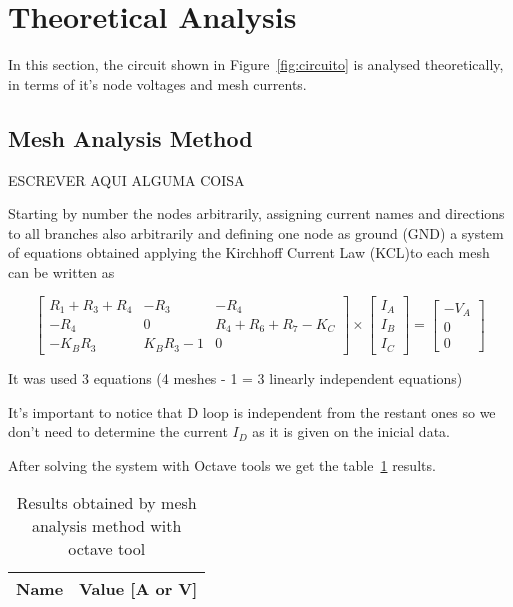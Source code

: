 \section{Theoretical Analysis}
\label{sec:analysis}

\hspace{0,5cm} In this section, the circuit shown in Figure~\ref{fig:circuito} is analysed
theoretically, in terms of it's node voltages and mesh currents.

\subsection{Mesh Analysis Method}

\hspace{0,5cm} ESCREVER AQUI ALGUMA COISA

Starting by number the nodes arbitrarily, assigning current names and directions to all branches also arbitrarily and defining one node as ground (GND) a system of equations obtained applying the Kirchhoff Current Law (KCL)to each mesh can be written as 

\begin{equation}
\begin{bmatrix} 
R_1 + R_3 + R_4 & -R_3 & -R_4 \\ 
-R_4 & 0 & R_4 + R_6 + R_7 - K_C\\
-K_B R_3 & K_B R_3 - 1 & 0
\end{bmatrix} 
\times
\begin{bmatrix} 
I_A \\ 
I_B \\ 
I_C
\end{bmatrix} =
\begin{bmatrix} 
-V_A \\ 
0 \\ 
0
\end{bmatrix}
\end{equation}

It was used 3 equations (4 meshes - 1 = 3 linearly independent equations)

It's important to notice that D loop is independent from the restant ones so we don't need to determine the current $I_D$ as it is given on the inicial data.
  
After solving the system with Octave tools we get the table~\ref{tab:mesh} results.

\begin{table}[h]
  \centering
  \begin{tabular}{|l|r|}
    \hline    
    {\bf Name} & {\bf Value [A or V]} \\ \hline
    
  \end{tabular}
  \caption{ Results obtained by mesh analysis method with octave tool}
  \label{tab:mesh}
\end{table}



